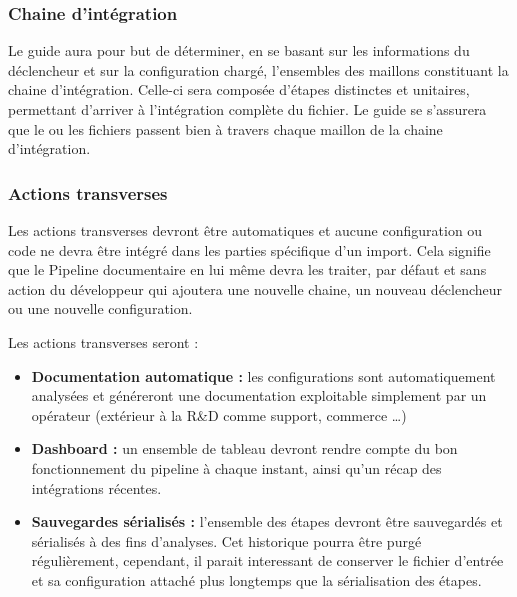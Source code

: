 \subsubsection{Chaine d'intégration}

Le guide aura pour but de déterminer, en se basant sur les informations du déclencheur et sur la configuration chargé, l'ensembles des maillons constituant la chaine d'intégration. Celle-ci sera composée d'étapes distinctes et unitaires, permettant d'arriver à l'intégration complète du fichier. Le guide se s'assurera que le ou les fichiers passent bien à travers chaque maillon de la chaine d'intégration.

\subsubsection{Actions transverses}

Les actions transverses devront être automatiques et aucune configuration ou code ne devra être intégré dans les parties spécifique d'un import. Cela signifie que le Pipeline documentaire en lui même devra les traiter, par défaut et sans action du développeur qui ajoutera une nouvelle chaine, un nouveau déclencheur ou une nouvelle configuration.

Les actions transverses seront :

\begin{itemize}
    \item \textbf{Documentation automatique :} les configurations sont automatiquement analysées et généreront une documentation exploitable simplement par un opérateur (extérieur à la R\&D comme support, commerce \dots)
    \item \textbf{Dashboard :} un ensemble de tableau devront rendre compte du bon fonctionnement du pipeline à chaque instant, ainsi qu'un récap des intégrations récentes.
    \item \textbf{Sauvegardes sérialisés :} l'ensemble des étapes devront être sauvegardés et sérialisés à des fins d'analyses. Cet historique pourra être purgé régulièrement, cependant, il parait interessant de conserver le fichier d'entrée et sa configuration attaché plus longtemps que la sérialisation des étapes.
\end{itemize}

